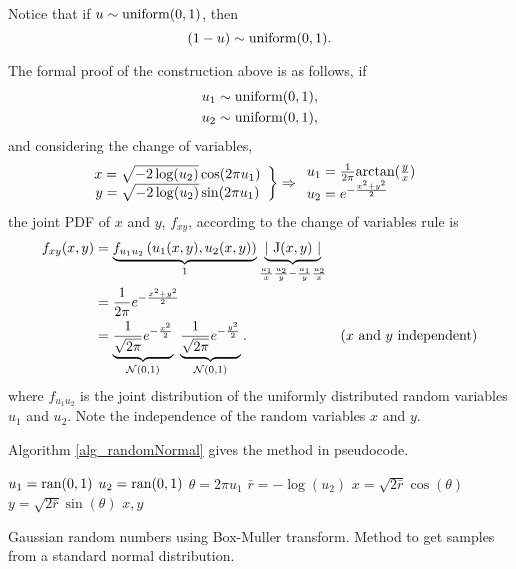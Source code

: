 \begin{remark} 
  Notice that if $u\sim\textup{uniform}(0,1)$, then $$(1-u) \sim \textup{uniform}(0,1).$$
\end{remark}

The formal proof of the construction above is as follows, if
$$
 \begin{aligned}
  u_1 \sim \textup{uniform}(0,1), \\
  u_2 \sim \textup{uniform}(0,1), \\
 \end{aligned}
$$
and considering the change of variables,
$$
 \left.
 \begin{array}{c}
  x = \sqrt{-2\log(u_2)}\cos(2\pi u_1) \\
  y = \sqrt{-2\log(u_2)}\sin(2\pi u_1) \\
 \end{array} \right\} \Rightarrow
 \begin{array}{l}
  u_1 = \frac{1}{2\pi} \textup{arctan}(\frac{y}{x}) \\
  u_2 = e^{-\frac{x^2+y^2}{2}} \\
 \end{array} 
 \ \ \,
$$
the joint PDF of $x$ and $y$, $f_{xy}$, according to the change of variables rule is
$$
 \begin{aligned}
  f_{xy}(x,y) &= \underbrace{f_{u_1 u_2}\left( u_1(x,y),u_2(x,y) \right)}_{1}
       \underbrace{\lvert \ \textup{J}(x,y) \ \rvert}_{\frac{u_1}{x}\frac{u_2}{y} - \frac{u_1}{y}\frac{u_2}{x}} \\
   &= \frac{1}{2\pi} e^{-\frac{x^2+y^2}{2}} \\
   &= \underbrace{\frac{1}{\sqrt{2\pi}} e^{-\frac{x^2}{2}}}_{\mathcal{N}(0,1)} \ 
      \underbrace{\frac{1}{\sqrt{2\pi}} e^{-\frac{y^2}{2}}}_{\mathcal{N}(0,1)}.
           & \text{($x$ and $y$ independent)}
 \end{aligned}
$$
where $f_{u_1 u_2}$ is the joint distribution of the uniformly distributed random variables $u_1$ and $u_2$. Note the independence of the random variables $x$ and $y$.

Algorithm \ref{alg_randomNormal} gives the method in pseudocode.

\vspace{5mm}
\begin{algorithm}[H]
\SetAlgoLined
  $u_1 = \textup{ran}(0,1)$\;
  $u_2 = \textup{ran}(0,1)$\;
  $\theta = 2\pi u_1$\;
  $\bar{r} = -\log(u_2)$\;
  $x = \sqrt{2\bar{r}}\cos(\theta)$\;
  $y = \sqrt{2\bar{r}}\sin(\theta)$\;
   ${x,y}$\;
\caption[Gaussian random numbers using Box-Muller transform]
{
  Gaussian random numbers using Box-Muller transform. Method to get samples from a standard normal distribution.
}
\label{alg_randomNormal}
\end{algorithm}
\vspace{5mm}


